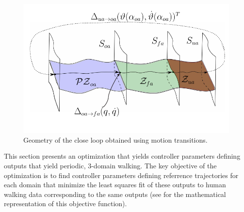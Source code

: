 \begin{figure}[t!]
\centering
\includegraphics[scale=0.55]{figures/PZD_Surfaces_ICRA-crop.pdf}
\caption{Geometry of the close loop obtained using motion transitions.}
\label{fig:PZD_Surfaces}
\end{figure}

This section presents an optimization that yields controller parameters defining outputs that yield periodic, 3-domain walking. The key objective of the optimization is to find controller parameters defining referrence trajectories for each domain that minimize the least squares fit of these outputs to human walking data corresponding to the same outputs (see \cite{ZYA2012,YPA12} for the mathematical representation of this objective function).


